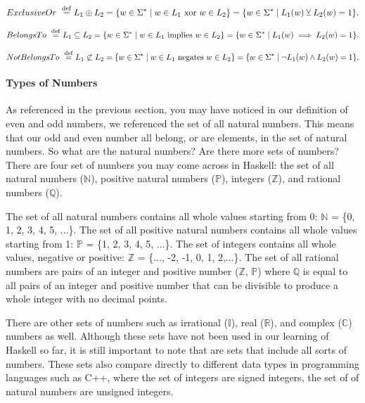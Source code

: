 \documentclass{article}
\begin{document}
 $$ Exclusive Or \ \stackrel{\rm def}{=} L_1\oplus L_2 = \{w\in\Sigma^\ast \mid w\in L_1 \textrm{ xor } w\in L_2\}= \{w\in\Sigma^\ast \mid L_1(w) \veebar L_2(w) = 1\}.$$

 $$ Belongs To \ \stackrel{\rm def}{=} L_1\subseteq L_2 = \{w\in\Sigma^\ast \mid w\in L_1 \textrm{ implies } w\in L_2\}= \{w\in\Sigma^\ast \mid L_1(w) \implies L_2(w) = 1\}.$$

 $$Not Belongs To \ \stackrel{\rm def}{=} L_1\not\subset L_2 = \{w\in\Sigma^\ast \mid w\in L_1 \textrm{ negates } w\in L_2\}= \{w\in\Sigma^\ast \mid \neg L_1(w) \wedge L_2(w) = 1\}.$$

\paragraph{Types of Numbers}

As referenced in the previous section, you may have noticed in our definition of even and odd numbers, we referenced the set of all natural numbers. This means that our odd and even number all belong, or are elements, in the set of natural numbers. So what are the natural numbers? Are there more sets of numbers? There are four set of numbers you may come across in Haskell: the set of all natural numbers ($\mathbb N$), positive natural numbers ($\mathbb P$), integers ($\mathbb Z$), and rational numbers ($\mathbb Q$).

\medskip\noindent
The set of all natural numbers contains all whole values starting from 0: $\mathbb N$ = \{0, 1, 2, 3, 4, 5, ...\}. The set of all positive natural numbers contains all whole values starting from 1: $\mathbb P$ = \{1, 2, 3, 4, 5, ...\}. The set of integers contains all whole values, negative or positive: $\mathbb Z$ = \{..., -2, -1, 0, 1, 2,...\}. The set of all rational numbers are pairs of an integer and positive number ($\mathbb Z$, $\mathbb P$) where $\mathbb Q$ is equal to all pairs of an integer and positive number that can be divisible to produce a whole integer with no decimal points. 

\medskip\noindent
There are other sets of numbers such as irrational ($\mathbb I$), real ($\mathbb R$), and complex ($\mathbb C$) numbers as well. Although these sets have not been used in our learning of Haskell so far, it is still important to note that are sets that include all sorts of numbers. These sets also compare directly to different data types in programming languages such as C++, where the set of integers are signed integers, the set of of natural numbers are unsigned integers. 
\end{document}
